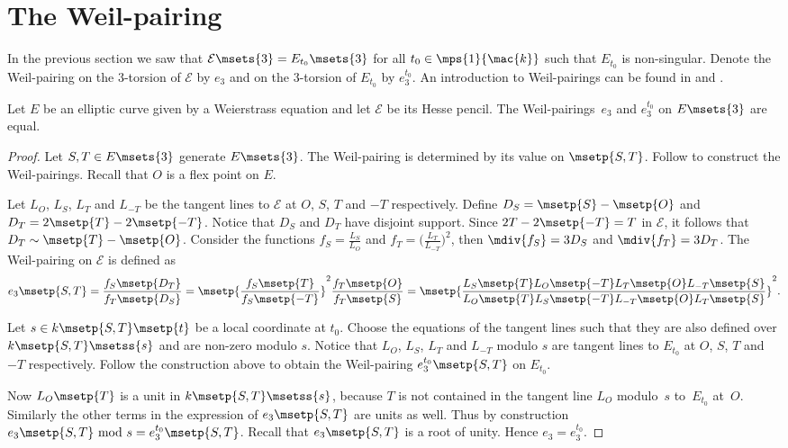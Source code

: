 \section{The Weil-pairing}\label{hpga:sec:wp}

In the previous section we saw that $\mathcal{E}\msets{3}=E_{t_0}\msets{3}$ for all $t_0\in\mps{1}{\mac{k}}$ such that $E_{t_0}$ is non-singular. Denote the Weil-pairing on the 3-torsion of $\mathcal{E}$ by $e_3$ and on the 3-torsion of $E_{t_0}$ by $e_3^{t_0}$. An introduction to Weil-pairings can be found in \cite[Section~III.8]{silverman1985} and \cite[Sections~3.3 and~11.2]{washington2008}.

\begin{Proposition}Let $E$ be an elliptic curve given by a Weierstrass equation and let $\mathcal {E}$ be its Hesse pencil. The Weil-pairings~$e_3$ and $e_3^{t_0}$ on $E\msets {3}$ are equal.
\end{Proposition}
\begin{proof}Let $S,T\in E\msets{3}$ generate $E\msets{3}$. The Weil-pairing is determined by its value on $\msetp{S,T}$. Follow \cite[Exercise~3.16]{silverman1985} to construct the Weil-pairings. Recall that $O$ is a flex point on $E$.

Let $L_O$, $L_S$, $L_T$ and $L_{-T}$ be the tangent lines to $\mathcal{E}$ at $O$, $S$, $T$ and $-T$ respectively. Define $D_S=\msetp{S}-\msetp{O}$ and $D_T= 2\msetp{T}-2\msetp{-T}$. Notice that $D_S$ and $D_T$ have disjoint support. Since $2T-2\msetp{-T}=T$ in $\mathcal{E}$, it follows that $D_T\sim\msetp{T}- \msetp{O}$. Consider the functions $f_S=\frac{L_S}{L_O}$ and $f_T=\big(\frac{L_T}{L_{-T}}\big)^2$, then $\mdiv{f_S}=3D_S$ and $\mdiv{f_T}=3D_T$. The Weil-pairing on $\mathcal{E}$ is defined as
\begin{gather*}
e_3\msetp{S,T}=\frac{f_S\msetp{D_T}}{f_T\msetp{D_S}} =\msetp{\frac{f_S\msetp{T}}{f_S\msetp{-T}}}^2\frac{f_T\msetp{O}}{f_T\msetp{S}}
=\msetp{\frac{L_S\msetp{T}L_O\msetp{-T}L_T\msetp{O}L_{-T}\msetp{S}}{L_O\msetp{T}L_S\msetp{-T}L_{-T}\msetp{O}L_T\msetp{S}}}^2.
\end{gather*}

Let $s\in k\msetp{S,T}\msetp{t}$ be a local coordinate at $t_0$. Choose the equations of the tangent lines such that they are also defined over $k\msetp{S,T}\msetss{s}$ and are non-zero modulo $s$. Notice that $L_O$, $L_S$, $L_T$ and $L_{-T}$ modulo $s$ are tangent lines to $E_{t_0}$ at $O$, $S$, $T$ and $-T$ respectively. Follow the construction above to obtain the Weil-pairing $e_3^{t_0}\msetp{S,T}$ on $E_{t_0}$.

Now $L_O\msetp{T}$ is a unit in $k\msetp{S,T}\msetss{s}$, because $T$ is not contained in the tangent line $L_O$ modulo~$s$ to~$E_{t_0}$ at~$O$. Similarly the other terms in the expression of $e_3\msetp{S,T}$ are units as well. Thus by construction $e_3\msetp{S,T}\!\!\mod s= e_3^{t_0}\msetp{S,T}$. Recall that $e_3\msetp{S,T}$ is a root of unity. Hence $e_3=e_3^{t_0}$.
\end{proof}

